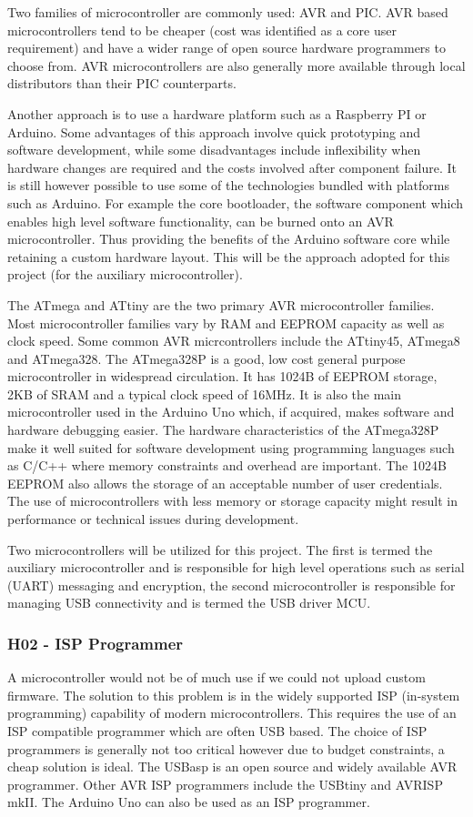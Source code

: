 Two families of microcontroller are commonly used: AVR and PIC. AVR based microcontrollers tend to be cheaper (cost was identified as a core user requirement) and have a wider range of open source hardware programmers to choose from. AVR microcontrollers are also generally more available through local distributors than their PIC counterparts.

Another approach is to use a hardware platform such as a Raspberry PI or Arduino. Some advantages of this approach involve quick prototyping and software development, while some disadvantages include inflexibility when hardware changes are required and the costs involved after component failure. It is still however possible to use some of the technologies bundled with platforms such as Arduino. For example the core bootloader, the software component which enables high level software functionality, can be burned onto an AVR microcontroller. Thus providing the benefits of the Arduino software core while retaining a custom hardware layout. This will be the approach adopted for this project (for the auxiliary microcontroller).


The ATmega and ATtiny are the two primary AVR microcontroller families. Most microcontroller families vary by RAM and EEPROM capacity as well as clock speed. Some common AVR micrcontrollers include the ATtiny45, ATmega8 and ATmega328. The ATmega328P is a good, low cost general purpose microcontroller in widespread circulation. It has 1024B of EEPROM storage, 2KB of SRAM and a typical clock speed of 16MHz. It is also the main microcontroller used in the Arduino Uno which, if acquired, makes software and hardware debugging easier. The hardware characteristics of the ATmega328P make it well suited for software development using programming languages such as C/C++ where memory constraints and overhead are important. The 1024B EEPROM also allows the storage of an acceptable number of user credentials. The use of microcontrollers with less memory or storage capacity might result in performance or technical issues during development.

Two microcontrollers will be utilized for this project. The first is termed the auxiliary microcontroller and is responsible for high level operations such as serial (UART) messaging and encryption, the second microcontroller is responsible for managing USB connectivity and is termed the USB driver MCU.

\subsubsection{H02 - ISP Programmer }
A microcontroller would not be of much use if we could not upload custom firmware. The solution to this problem is in the widely supported ISP (in-system programming) capability of modern microcontrollers. This requires the use of an ISP compatible programmer which are often USB based. The choice of ISP programmers is generally not too critical however due to budget constraints, a cheap solution is ideal. The USBasp is an open source and widely available AVR programmer.  Other AVR ISP programmers include the USBtiny and AVRISP mkII. The Arduino Uno can also be used as an ISP programmer.
